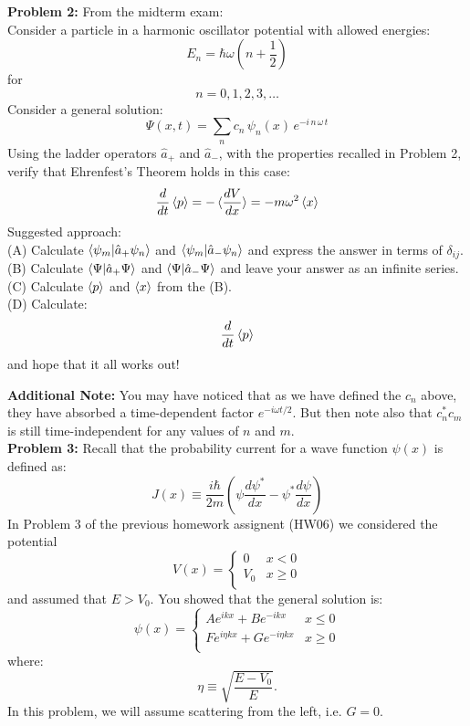 \documentclass[12pt]{article}
\begin{document}
\noindent
{\bf Problem 2:} From the midterm exam:\\

\noindent
Consider a particle in a harmonic oscillator potential with allowed energies:
\begin{equation}
E_n = \hbar \omega \left( n + \frac{1}{2} \right)
\end{equation}
for
$$n=0,1,2,3,\ldots$$
Consider a general solution:
$$\Psi(x,t) = \sum_n c_n \, \psi_n(x) \, e^{-i\,n\,\omega\,t}$$
Using the ladder operators $\hat{a}_+$ and $\hat{a}_-$, with the properties recalled in Problem 2, verify that Ehrenfest's Theorem holds in this case:
$$\frac{d}{dt}\braket{p} = -\braket{\frac{dV}{dx}} = -m\omega^2 \braket{x}$$
Suggested approach:\\
(A) Calculate $\braket{\psi_m|\hat{a}_+\psi_n}$ and $\braket{\psi_m|\hat{a}_-\psi_n}$ and express the answer in terms of $\delta_{ij}$.\\[5pt]
(B) Calculate $\braket{\Psi|\hat{a}_+\Psi}$ and $\braket{\Psi|\hat{a}_-\Psi}$ and leave your answer as an infinite series.\\[5pt]
(C) Calculate $\braket{p}$ and $\braket{x}$ from the (B).\\[5pt]
(D) Calculate:
$$\frac{d}{dt}\braket{p}$$
and hope that it all works out!

{\bf Additional Note:} You may have noticed that as we have defined the $c_n$ above, they have absorbed a time-dependent factor $e^{-i\omega t/2}$.  But then note also that $c_n^*c_m$ is still time-independent for any values of $n$ and $m$.  \\[5pt]

\noindent
{\bf Problem 3:}
Recall that the probability current for a wave function $\psi(x)$ is defined as:
$$J(x) \equiv \frac{i\hbar}{2m}\left( \psi \frac{d\psi^*}{dx} - \psi^* \frac{d\psi}{dx}\right)$$
In Problem 3 of the previous homework assignent (HW06) we considered the potential
$$V(x) = \begin{cases}
0   &  x < 0 \\
V_0 &  x \geq 0 \\
\end{cases}
$$
and assumed that $E>V_0$.  You showed that the general solution is:
$$\psi(x) = \begin{cases}
A e^{\displaystyle ikx} + B e^{\displaystyle -ikx} &  x\leq0 \\
F e^{\displaystyle i\eta kx} + G e^{\displaystyle -i \eta kx} &  x\geq0 \\
\end{cases}$$
where:
$$\eta \equiv \sqrt{\frac{E-V_0}{E}}.$$
In this problem, we will assume scattering from the left, i.e. $G=0$.\\[5pt]
\end{document}
